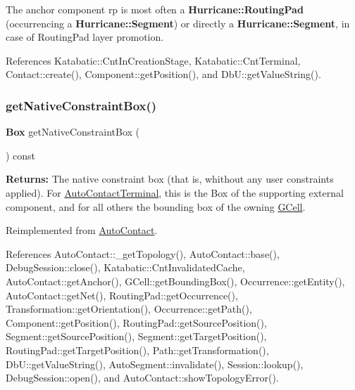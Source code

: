 The anchor component {\ttfamily rp} is most often a \textbf{ Hurricane\+::\+Routing\+Pad} (occurrencing a \textbf{ Hurricane\+::\+Segment}) or directly a \textbf{ Hurricane\+::\+Segment}, in case of Routing\+Pad layer promotion. 

References Katabatic\+::\+Cnt\+In\+Creation\+Stage, Katabatic\+::\+Cnt\+Terminal, Contact\+::create(), Component\+::get\+Position(), and Db\+U\+::get\+Value\+String().

\mbox{\label{classKatabatic_1_1AutoContactTerminal_a00ed934305dd186a284b7a13b5798cb6}} 
\subsubsection{\texorpdfstring{get\+Native\+Constraint\+Box()}{getNativeConstraintBox()}}
{\footnotesize\ttfamily \textbf{ Box} get\+Native\+Constraint\+Box (\begin{DoxyParamCaption}{ }\end{DoxyParamCaption}) const\hspace{0.3cm}{\ttfamily [virtual]}}

{\bfseries Returns\+:} The native constraint box (that is, whithout any user constraints applied). For \hyperlink{classKatabatic_1_1AutoContactTerminal}{Auto\+Contact\+Terminal}, this is the Box of the supporting external component, and for all others the bounding box of the owning \hyperlink{classKatabatic_1_1GCell}{G\+Cell}. 

Reimplemented from \hyperlink{classKatabatic_1_1AutoContact_a00ed934305dd186a284b7a13b5798cb6}{Auto\+Contact}.



References Auto\+Contact\+::\+\_\+get\+Topology(), Auto\+Contact\+::base(), Debug\+Session\+::close(), Katabatic\+::\+Cnt\+Invalidated\+Cache, Auto\+Contact\+::get\+Anchor(), G\+Cell\+::get\+Bounding\+Box(), Occurrence\+::get\+Entity(), Auto\+Contact\+::get\+Net(), Routing\+Pad\+::get\+Occurrence(), Transformation\+::get\+Orientation(), Occurrence\+::get\+Path(), Component\+::get\+Position(), Routing\+Pad\+::get\+Source\+Position(), Segment\+::get\+Source\+Position(), Segment\+::get\+Target\+Position(), Routing\+Pad\+::get\+Target\+Position(), Path\+::get\+Transformation(), Db\+U\+::get\+Value\+String(), Auto\+Segment\+::invalidate(), Session\+::lookup(), Debug\+Session\+::open(), and Auto\+Contact\+::show\+Topology\+Error().

